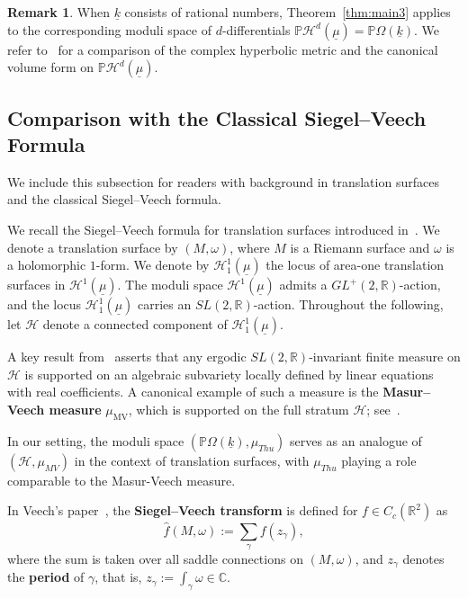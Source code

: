 \documentclass{compositio}
\numberwithin{equation}{section}
\numberwithin{figure}{section}
\theoremstyle{definition}
\newtheorem{remark}[definition]{Remark}
\theoremstyle{plain}
\begin{document}
{\begin{remark}
    When $\underline{k}$ consists of rational numbers, Theorem~\ref{thm:main3} applies to the corresponding moduli space of $d$-differentials $\mathbb{P}\mathcal{H}^{d}(\underline{\mu}) = \mathbb{P}\Omega(\underline{k})$. We refer to~\cite{NguyenVolForm} for a comparison of the complex hyperbolic metric and the canonical volume form on $\mathbb{P}\mathcal{H}^{d}(\underline{\mu})$.
\end{remark}




\subsection{Comparison with the Classical Siegel--Veech Formula}\label{sec:comparisonsiegelveech}
We include this subsection for readers with background in translation surfaces and the classical Siegel--Veech formula.

We recall the Siegel--Veech formula for translation surfaces introduced in~\cite{Veech}. We denote a translation surface by $(M,\omega)$, where $M$ is a Riemann surface and $\omega$ is a holomorphic $1$-form. We denote by $\mathcal{H}^1_{1}(\underline{\mu})$ the locus of area-one translation surfaces in $\mathcal{H}^1(\underline{\mu})$. The moduli space $\mathcal{H}^1(\underline{\mu})$ admits a $GL^+(2,\mathbb{R})$-action, and the locus $\mathcal{H}^1_1(\underline{\mu})$ carries an $SL(2,\mathbb{R})$-action. Throughout the following, let $\mathcal{H}$ denote a connected component of $\mathcal{H}^1_1(\underline{\mu})$.

A key result from~\cite{EMir,EMirMoh,Filip2016} asserts that any ergodic $SL(2,\mathbb{R})$-invariant finite measure on $\mathcal{H}$ is supported on an algebraic subvariety locally defined by linear equations with real coefficients. A canonical example of such a measure is the \textbf{Masur--Veech measure} $\mu_{\mathrm{MV}}$, which is supported on the full stratum $\mathcal{H}$; see~\cite{Masur1982,Veech1982,Masur1991}.

In our setting, the moduli space $(\mathbb{P}\Omega(\underline{k}),\mu_{Thu})$ serves as an analogue of $(\mathcal{H},\mu_{MV})$ in the context of translation surfaces, with $\mu_{Thu}$ playing a role comparable to the Masur-Veech measure.

In Veech's paper~\cite{Veech}, the \textbf{Siegel--Veech transform} is defined for $f\in C_c(\mathbb{R}^2)$ as
$$
\hat{f}(M,\omega) := \sum_{\gamma} f(z_\gamma),
$$
where the sum is taken over all saddle connections on $(M, \omega)$, and $z_\gamma$ denotes the \textbf{period} of $\gamma$, that is, $z_\gamma := \int_\gamma \omega \in \mathbb{C}$.

}
\end{document}
